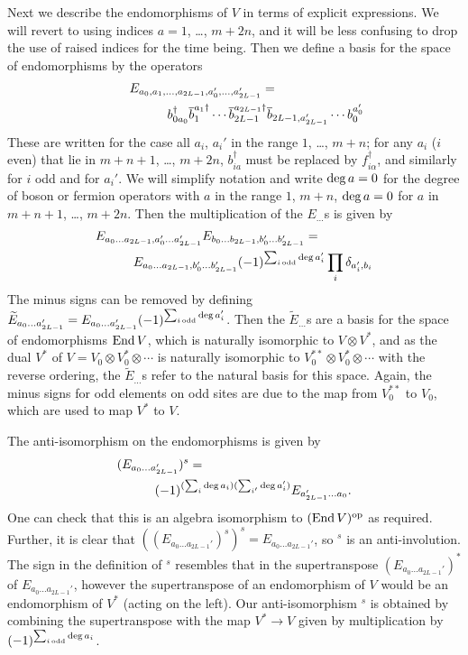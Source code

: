 \documentclass[twocolumn,floats,pra]{revtex4}
\newcommand {\bea}{\begin{eqnarray}}
\newcommand {\eea} {\end{eqnarray}}
\begin{document}
Next we describe the endomorphisms of $V$ in terms of explicit
expressions. We will revert to using indices $a=1$, \ldots,
$m+2n$, and it will be less confusing to drop the use of raised
indices for the time being. Then we define a basis for the space
of endomorphisms by the operators %
\bea%
\lefteqn{E_{a_0,a_1,\ldots,a_{2L-1},a_0',\ldots,a_{2L-1}'}=}&&\nonumber\\
\qquad&&\qquad b_{0a_0}^\dagger \overline{b}_1^{a_1\dagger}\cdots
\overline{b}_{2L-1}^{a_{2L-1}\dagger}\overline{b}_{2L-1,a_{2L-1}'}\cdots
b_0^{a_0'}\eea %
These are written for the case all $a_i$, $a_i'$ in the range $1$,
\ldots, $m+n$; for any $a_i$ ($i$ even) that lie in $m+n+1$,
\ldots, $m+2n$, $b_{ia}^\dagger$ must be replaced by
$f_{i\alpha}^\dagger$, and similarly for $i$ odd and for $a_i'$.
We will simplify notation and write ${\rm deg}\, a=0$ for the
degree of boson or fermion operators with $a$ in the range $1$,
$m+n$, ${\rm deg}\, a=0$ for $a$ in $m+n+1$, \ldots, $m+2n$. Then
the multiplication of the $E_{\ldots}$s is given by%
\bea%
\lefteqn{E_{a_0\ldots a_{2L-1},a_0'\ldots a_{2L-1}'}E_{b_0\ldots
b_{2L-1},b_0'\ldots b_{2L-1}'}=}&&\nonumber\\
&&\qquad E_{a_0\ldots a_{2L-1},b_0'\ldots
b_{2L-1}'}(-1)^{\sum_{i\,{\rm odd}}{\rm deg}\,a_i'} \prod_i
\delta_{a_i',b_i}
\eea%
The minus signs can be removed by defining
$\widetilde{E}_{a_0\ldots a_{2L-1}'}=E_{a_0\ldots
a_{2L-1}'}(-1)^{\sum_{i\,{\rm odd}}{\rm deg}\,a_i'}$. Then the
$\widetilde{E}_{\ldots}$s are a basis for the space of
endomorphisms ${\rm End}\, V$, which is naturally isomorphic to
$V\otimes V^*$, and as the dual $V^*$ of $V=V_0\otimes
V_0^*\otimes\cdots$ is naturally isomorphic to $V_0^{**}\otimes
V_0^*\otimes\cdots$ with the reverse ordering, the
$\widetilde{E}_{\ldots}$s refer to the natural basis for this
space. Again, the minus signs for odd elements on odd sites are
due to the map from $V_0^{**}$ to $V_0$, which are used to map
$V^*$ to $V$.

The anti-isomorphism on the endomorphisms is given by %
\bea%
\lefteqn{(E_{{a_0}\ldots a_{2L-1}'})^s =}\nonumber\\
&&\qquad (-1)^{(\sum_i{\rm deg}\,a_i)(\sum_{i'}{\rm
deg}\,a_i')}E_{a_{2L-1}'\ldots a_0}.\eea%
One can check that this is an algebra isomorphism to $({\rm End}\,
V)^{\rm op}$ as required. Further, it is clear that
$((E_{{a_0}\ldots a_{2L-1}'})^s)^s= E_{{a_0}\ldots a_{2L-1}'}$, so
$^s$ is an anti-involution. The sign in the definition of $^s$
resembles that in the supertranspose $(E_{{a_0}\ldots
a_{2L-1}'})^*$ of $E_{{a_0}\ldots a_{2L-1}'}$, however the
supertranspose of an endomorphism of $V$ would be an endomorphism
of $V^*$ (acting on the left). Our anti-isomorphism $^s$ is
obtained by combining the supertranspose with the map $V^*\to V$
given by multiplication by $(-1)^{\sum_{i\,\rm odd}{\rm deg}\,
a_i}$.
\end{document}
